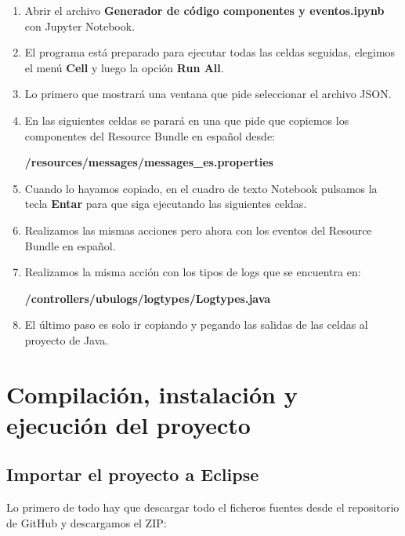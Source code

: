 \begin{enumerate}
	\item Abrir el archivo \textbf{Generador de código componentes y eventos.ipynb} con Jupyter Notebook.
	\item El programa está preparado para ejecutar todas las celdas seguidas, elegimos el menú \textbf{Cell} y luego la opción \textbf{Run All}.
	\item Lo primero que mostrará una ventana que pide seleccionar el archivo JSON.
	\item En las siguientes celdas se parará en una que pide que copiemos los componentes del Resource Bundle en español desde:
	
	\textbf{/resources/messages/messages\_es.properties}
	\item Cuando lo hayamos copiado, en el cuadro de texto Notebook pulsamos la tecla \textbf{Entar} para que siga ejecutando las siguientes celdas.
	\item Realizamos las mismas acciones pero ahora con los eventos del Resource Bundle en español.
	\item Realizamos la misma acción con los tipos de logs que se encuentra en:
	
	 \textbf{/controllers/ubulogs/logtypes/Logtypes.java}
	\item El último paso es solo ir copiando y pegando las salidas de las celdas al proyecto de Java.
\end{enumerate}



\section{Compilación, instalación y ejecución del proyecto}

\subsection{Importar el proyecto a Eclipse}
Lo primero de todo hay que descargar todo el ficheros fuentes desde el repositorio de GitHub y descargamos el ZIP:

